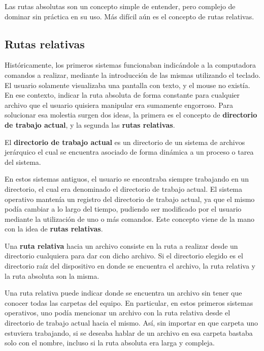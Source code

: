 Las rutas absolutas son un concepto simple de entender, pero complejo de dominar
sin práctica en su uso. Más difícil aún es el concepto de rutas relativas.

\subsection{Rutas relativas}
\label{chap:informatica:subsec:rutas_relativas}

Históricamente, los primeros sistemas funcionaban indicándole a la computadora
comandos a realizar, mediante la introducción de las mismas utilizando el
teclado. El usuario solamente visualizaba una pantalla con texto, y el mouse no
existía. En ese contexto, indicar la ruta absoluta de forma constante para
cualquier archivo que el usuario quisiera manipular era sumamente engorroso.
Para solucionar esa molestia surgen dos ideas, la primera es el concepto de
\textbf{directorio de trabajo actual}, y la segunda las \textbf{rutas
relativas}.

\begin{definition}
    El \textbf{directorio de trabajo actual} es un directorio de un sistema de
    archivos jerárquico el cual se encuentra asociado de forma dinámica a un
    proceso o tarea del sistema.
\end{definition}

En estos sistemas antiguos, el usuario se encontraba siempre trabajando en un
directorio, el cual era denominado el directorio de trabajo actual. El sistema
operativo mantenía un registro del directorio de trabajo actual, ya que el mismo
podía cambiar a lo largo del tiempo, pudiendo ser modificado por el usuario
mediante la utilización de uno o más comandos. Este concepto viene de la mano
con la idea de \textbf{rutas relativas}.

\begin{definition}
    Una \textbf{ruta relativa} hacia un archivo consiste en la ruta a realizar
    desde un directorio cualquiera para dar con dicho archivo. Si el directorio
    elegido es el directorio raíz del dispositivo en donde se encuentra el
    archivo, la ruta relativa y la ruta absoluta son la
    misma.\autocite[vid.]{foldoc_relative_2018}
\end{definition}

Una ruta relativa puede indicar donde se encuentra un archivo sin tener que
conocer todas las carpetas del equipo. En particular, en estos primeros sistemas
operativos, uno podía mencionar un archivo con la ruta relativa desde el
directorio de trabajo actual hacia el mismo. Así, sin importar en que carpeta
uno estuviera trabajando, si se deseaba hablar de un archivo en esa carpeta
bastaba solo con el nombre, incluso si la ruta absoluta era larga y compleja.

